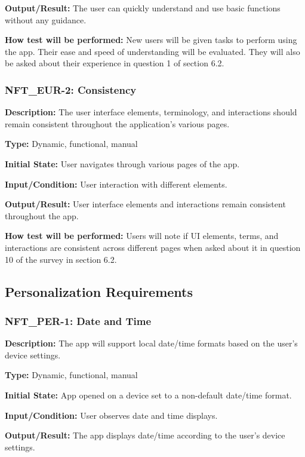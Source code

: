 \documentclass[12pt, titlepage]{article}
\begin{document}
\textbf{Output/Result:} The user can quickly understand and use basic functions without any guidance.

\textbf{How test will be performed:} New users will be given tasks to perform using the app. Their ease and speed of understanding will be evaluated. They will also be asked about their experience in question 1 of section 6.2. 


\subsubsection*{\textbf{NFT\_EUR-2: Consistency}
}

\textbf{Description: }The user interface elements, terminology, and interactions should remain consistent throughout the application’s various pages.

\textbf{Type:} Dynamic, functional, manual

\textbf{Initial State: }User navigates through various pages of the app.

\textbf{Input/Condition:} User interaction with different elements.

\textbf{Output/Result: }User interface elements and interactions remain consistent throughout the app.

\textbf{How test will be performed: }Users will note if UI elements, terms, and interactions are consistent across different pages when asked about it in question 10 of the survey in section 6.2. 
\newline
\subsection{Personalization Requirements}


\subsubsection*{\textbf{NFT\_PER-1: Date and Time}
}

\textbf{Description: }The app will support local date/time formats based on the user’s device settings.

\textbf{Type: }Dynamic, functional, manual

\textbf{Initial State: }App opened on a device set to a non-default date/time format.

\textbf{Input/Condition: }User observes date and time displays.

\textbf{Output/Result: }The app displays date/time according to the user's device settings.
\end{document}
